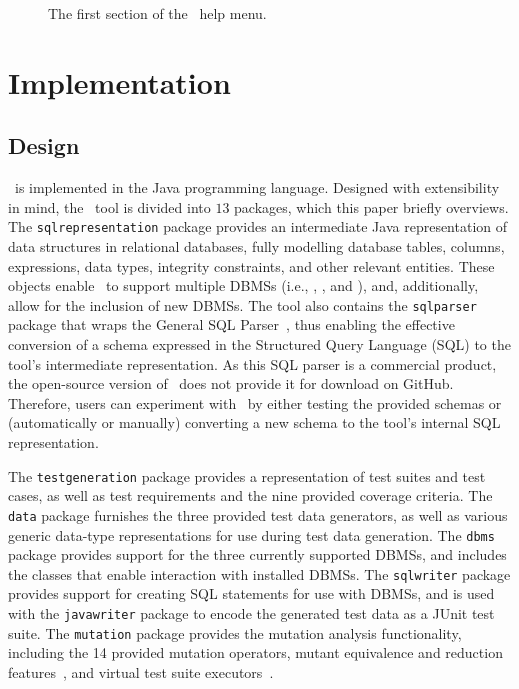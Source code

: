 \begin{figure}

\caption{\label{fig:usage} The first section of the \sa~help menu.}
\end{figure}

\section{Implementation}\label{sec:implementation}
\subsection{Design}


\sa~is implemented in the Java programming language.  Designed with extensibility in mind, the \sa~tool is divided into
$13$ packages, which this paper briefly overviews. The \texttt{sqlrepresentation} package provides an intermediate Java
representation of data structures in relational databases, fully modelling database tables, columns, expressions, data
types, integrity constraints, and other relevant entities. These objects enable \sa~to support multiple DBMSs (i.e.,
\sqlite, \postgres, and \hypersql), and, additionally, allow for the inclusion of new DBMSs. The tool also contains the
\texttt{sqlparser} package that wraps the General SQL Parser~\cite{generalsqlparser}, thus enabling the effective
conversion of a schema expressed in the Structured Query Language (SQL) to the tool's intermediate representation. As
this SQL parser is a commercial product, the open-source version of \sa~does not provide it for download on GitHub.
Therefore, users can experiment with \sa~by either testing the provided schemas or (automatically or manually)
converting a new schema to the tool's internal SQL representation.


The \texttt{testgeneration} package provides a representation of test suites and test cases, as well as test
requirements and the nine provided coverage criteria.  The \texttt{data} package furnishes the three provided test data
generators, as well as various generic data-type representations for use during test data generation. The \texttt{dbms}
package provides support for the three currently supported DBMSs, and includes the classes that enable interaction with
installed DBMSs. The \texttt{sqlwriter} package provides support for creating SQL statements for use with DBMSs, and is
used with the \texttt{javawriter} package to encode the generated test data as a JUnit test suite.  The
\texttt{mutation} package provides the mutation analysis functionality, including the 14 provided mutation operators,
mutant equivalence and reduction features~\cite{wright2014impact}, and virtual test suite
executors~\cite{mcminn2016virtual}.

